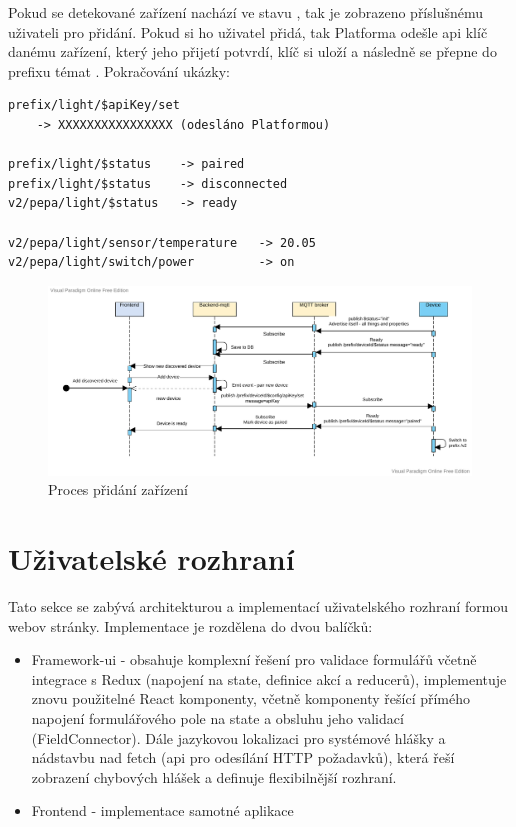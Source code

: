 Pokud se detekované zařízení nachází ve stavu , tak je zobrazeno příslušnému uživateli pro přidání. Pokud si ho uživatel přidá, tak Platforma odešle api klíč danému zařízení, který jeho přijetí potvrdí, klíč si uloží a následně se přepne do prefixu témat . Pokračování ukázky:

\begin{verbatim}
prefix/light/$apiKey/set
    -> XXXXXXXXXXXXXXXX (odesláno Platformou)

prefix/light/$status    -> paired
prefix/light/$status    -> disconnected
v2/pepa/light/$status   -> ready

v2/pepa/light/sensor/temperature   -> 20.05
v2/pepa/light/switch/power         -> on
\end{verbatim}

\begin{figure}[htbp]
    \centering
    \includegraphics[width=\textwidth]{img/pairing_communication.pdf}
    \caption{Proces přidání zařízení}
\end{figure}

\section{Uživatelské rozhraní}
Tato sekce se zabývá architekturou a implementací uživatelského rozhraní formou webov stránky. Implementace je rozdělena do dvou balíčků:
\begin{itemize}
    \item Framework-ui - obsahuje komplexní řešení pro validace formulářů včetně integrace s Redux (napojení na state, definice akcí a reducerů), implementuje znovu použitelné React komponenty, včetně komponenty řešící přímého napojení formulářového pole na state a obsluhu jeho validací (FieldConnector). Dále jazykovou lokalizaci pro systémové hlášky a nádstavbu nad fetch (api pro odesílání HTTP požadavků), která řeší zobrazení chybových hlášek a definuje flexibilnější rozhraní.
    \item Frontend - implementace samotné aplikace
\end{itemize}

